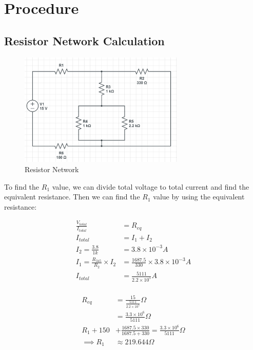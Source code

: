 \chapter{Procedure}

\section{Resistor Network Calculation}

\begin{figure}[h]
    \centering
    \includegraphics[width=0.7\textwidth]{assets/p1-circuit-scheme.png}
    \caption{Resistor Network}
    \label{fig:resistor_network}
\end{figure}

To find the $R_1$ value, we can divide total voltage to total current and find the equivalent resistance. Then we can find the $R_1$ value by using the equivalent resistance:

\begin{align*}
    \frac{V_{total}}{I_{total}} &= R_{eq} \\
    I_{total} &= I_1 + I_2 \\
    I_2 = \frac{3.8}{1k} &= 3.8\times 10^{-3}A \\
    I_1 = \frac{R_{345}}{R_2}\times I_2 &= \frac{1687.5}{330}\times 3.8\times 10^{-3}A \\
    I_{total} &= \frac{5111}{2.2\times 10^5}A \\
\end{align*}

\newpage
\thispagestyle{plain}

\begin{align*}
    R_{eq} &= \frac{15}{\frac{5111}{2.2\times 10^5}}\Omega \\
    &= \frac{3.3\times10^6}{5111}\Omega \\
    R_1 + 150 &+ \frac{1687.5\times 330}{1687.5 + 330} = \frac{3.3\times10^6}{5111}\Omega \\
    \implies R_1 &\approx 219.644\Omega \\
\end{align*}

